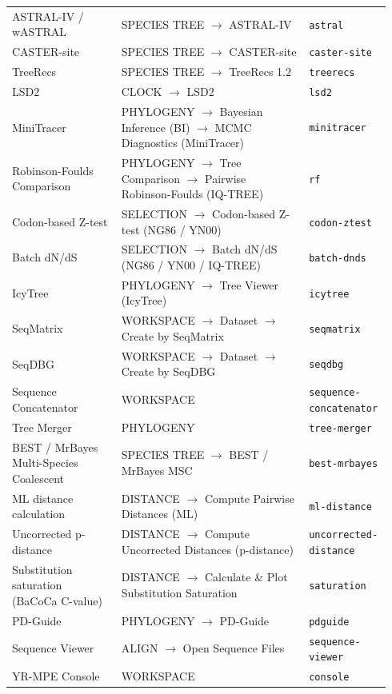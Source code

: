 \documentclass[11pt]{report}
\begin{document}
\begin{longtable}{@{}p{0.28\linewidth}p{0.48\linewidth}p{0.18\linewidth}@{}}
ASTRAL-IV / wASTRAL & SPECIES TREE $\rightarrow$ ASTRAL-IV & \texttt{astral} \\
CASTER-site & SPECIES TREE $\rightarrow$ CASTER-site & \texttt{caster-site} \\
TreeRecs & SPECIES TREE $\rightarrow$ TreeRecs 1.2 & \texttt{treerecs} \\
LSD2 & CLOCK $\rightarrow$ LSD2 & \texttt{lsd2} \\
MiniTracer & PHYLOGENY $\rightarrow$ Bayesian Inference (BI) $\rightarrow$ MCMC Diagnostics (MiniTracer) & \texttt{minitracer} \\
Robinson-Foulds Comparison & PHYLOGENY $\rightarrow$ Tree Comparison $\rightarrow$ Pairwise Robinson-Foulds (IQ-TREE) & \texttt{rf} \\
Codon-based Z-test & SELECTION $\rightarrow$ Codon-based Z-test (NG86 / YN00) & \texttt{codon-ztest} \\
Batch dN/dS & SELECTION $\rightarrow$ Batch dN/dS (NG86 / YN00 / IQ-TREE) & \texttt{batch-dnds} \\
IcyTree & PHYLOGENY $\rightarrow$ Tree Viewer (IcyTree) & \texttt{icytree} \\
SeqMatrix & WORKSPACE $\rightarrow$ Dataset $\rightarrow$ Create by SeqMatrix & \texttt{seqmatrix} \\
SeqDBG & WORKSPACE $\rightarrow$ Dataset $\rightarrow$ Create by SeqDBG & \texttt{seqdbg} \\
Sequence Concatenator & WORKSPACE & \texttt{sequence-concatenator} \\
Tree Merger & PHYLOGENY & \texttt{tree-merger} \\
BEST / MrBayes Multi-Species Coalescent & SPECIES TREE $\rightarrow$ BEST / MrBayes MSC & \texttt{best-mrbayes} \\
ML distance calculation & DISTANCE $\rightarrow$ Compute Pairwise Distances (ML) & \texttt{ml-distance} \\
Uncorrected p-distance & DISTANCE $\rightarrow$ Compute Uncorrected Distances (p-distance) & \texttt{uncorrected-distance} \\
Substitution saturation (BaCoCa C-value) & DISTANCE $\rightarrow$ Calculate \& Plot Substitution Saturation & \texttt{saturation} \\
PD-Guide & PHYLOGENY $\rightarrow$ PD-Guide & \texttt{pdguide} \\
Sequence Viewer & ALIGN $\rightarrow$ Open Sequence Files & \texttt{sequence-viewer} \\
YR-MPE Console & WORKSPACE & \texttt{console} \\

\end{longtable}
\end{document}
